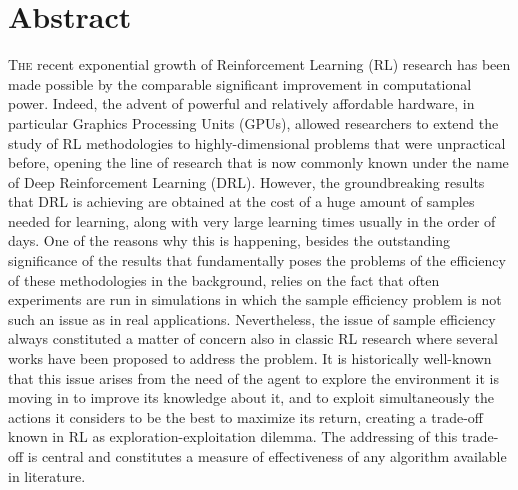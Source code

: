 \chapter*{Abstract}
\lettrine{T}{he} recent exponential growth of Reinforcement Learning (RL) research has been made possible by the comparable significant improvement in computational power. Indeed, the advent of powerful and relatively affordable hardware, in particular Graphics Processing Units (GPUs), allowed researchers to extend the study of RL methodologies to highly-dimensional problems that were unpractical before, opening the line of research that is now commonly known under the name of Deep Reinforcement Learning (DRL). However, the groundbreaking results that DRL is achieving are obtained at the cost of a huge amount of samples needed for learning, along with very large learning times usually in the order of days. One of the reasons why this is happening, besides the outstanding significance of the results that fundamentally poses the problems of the efficiency of these methodologies in the background, relies on the fact that often experiments are run in simulations in which the sample efficiency problem is not such an issue as in real applications. Nevertheless, the issue of sample efficiency always constituted a matter of concern also in classic RL research where several works have been proposed to address the problem. It is historically well-known that this issue arises from the need of the agent to explore the environment it is moving in to improve its knowledge about it, and to exploit simultaneously the actions it considers to be the best to maximize its return, creating a trade-off known in RL as exploration-exploitation dilemma. The addressing of this trade-off is central and constitutes a measure of effectiveness of any algorithm available in literature. 

